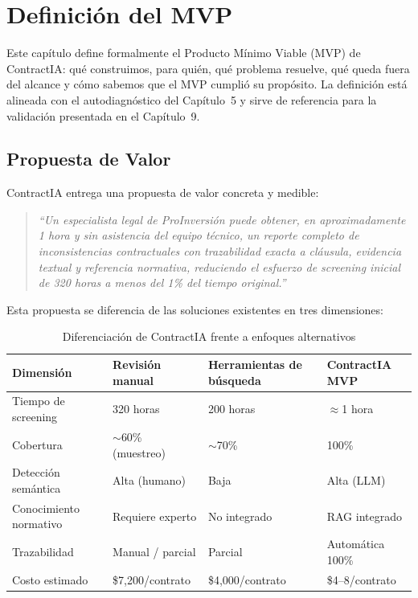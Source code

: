 \chapter{Definición del MVP}

Este capítulo define formalmente el Producto Mínimo Viable (MVP) de ContractIA:
qué construimos, para quién, qué problema resuelve, qué queda fuera del alcance
y cómo sabemos que el MVP cumplió su propósito. La definición está alineada con
el autodiagnóstico del Capítulo~5 y sirve de referencia para la validación
presentada en el Capítulo~9.

\section{Propuesta de Valor}

ContractIA entrega una propuesta de valor concreta y medible:

\begin{quote}
\textit{``Un especialista legal de ProInversión puede obtener, en aproximadamente
1 hora y sin asistencia del equipo técnico, un reporte completo de inconsistencias
contractuales con trazabilidad exacta a cláusula, evidencia textual y referencia
normativa, reduciendo el esfuerzo de screening inicial de 320 horas a menos del
1\% del tiempo original.''}
\end{quote}

Esta propuesta se diferencia de las soluciones existentes en tres dimensiones:

\begin{table}[H]
\centering
\caption{Diferenciación de ContractIA frente a enfoques alternativos}
\label{tab:diferenciacion}
\begin{tabular}{p{3.5cm} p{3.5cm} p{3.5cm} p{3.5cm}}
\toprule
\textbf{Dimensión} & \textbf{Revisión manual} &
\textbf{Herramientas de búsqueda} & \textbf{ContractIA MVP} \\
\midrule
Tiempo de screening & 320 horas & 200 horas & $\approx$1 hora \\[3pt]
Cobertura & $\sim$60\% (muestreo) & $\sim$70\% & 100\% \\[3pt]
Detección semántica & Alta (humano) & Baja & Alta (LLM) \\[3pt]
Conocimiento normativo & Requiere experto & No integrado & RAG integrado \\[3pt]
Trazabilidad & Manual / parcial & Parcial & Automática 100\% \\[3pt]
Costo estimado & \$7{,}200/contrato & \$4{,}000/contrato & \$4--8/contrato \\
\bottomrule
\end{tabular}
\end{table}

